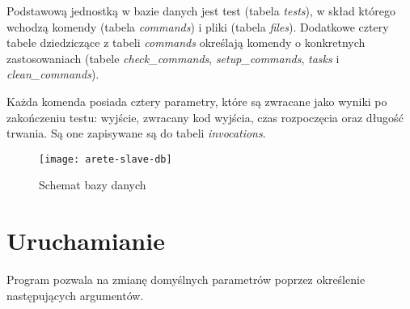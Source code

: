 \documentclass[00-praca-magisterska.tex]{subfiles}
\begin{document}
Podstawową jednostką w bazie danych jest test (tabela \emph{tests}), w skład
którego wchodzą komendy (tabela \emph{commands}) i pliki (tabela \emph{files}).
Dodatkowe cztery tabele dziedziczące z tabeli \emph{commands} określają komendy
o konkretnych zastosowaniach (tabele \emph{check\_commands},
\emph{setup\_commands}, \emph{tasks} i \emph{clean\_commands}).

Każda komenda posiada cztery parametry, które są zwracane jako wyniki po
zakończeniu testu: wyjście, zwracany kod wyjścia, czas rozpoczęcia oraz długość
trwania. Są one zapisywane są do tabeli \emph{invocations}.

\begin{figure}[htb]
\begin{center}
\leavevmode
\texttt{[image: arete-slave-db]}
\end{center}
\caption{Schemat bazy danych}
\label{fig:arete-slave-db}
\end{figure}

\section{Uruchamianie}
\label{arete-slave-uruchamianie}

Program  pozwala na zmianę domyślnych parametrów poprzez
określenie następujących argumentów.
\end{document}
